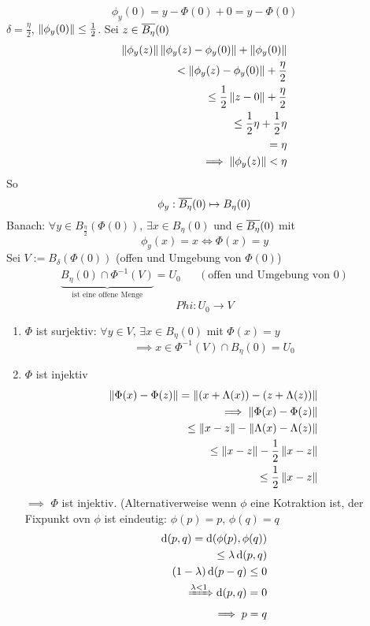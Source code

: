 \[\phi_y(0)=y-\Phi(0)+0=y-\Phi(0)\]
$\delta=\frac{\eta}{2}$, $\left\| \phi_y(0) \right\|\leq\frac{1}{2}$. Sei $z\in\overline{B_\eta}(0)$
\begin{eqnarray*}
  \left\| \phi_y(z) \right\|\left\| \phi_y(z)-\phi_y(0) \right\|+\left\| \phi_y(0) \right\|\\
  <\left\| \phi_y(z)-\phi_y(0) \right\|+\frac{\eta}{2}\\
  \leq\frac{1}{2}\left\| z-0 \right\|+\frac{\eta}{2}\\
  \leq \frac{1}{2}\eta+\frac{1}{2}\eta\\
  =\eta\\
  \implies\left\| \phi_y(z) \right\|<\eta
\end{eqnarray*}
So 
\[\phi_y:\overline{B_\eta}(0)\mapsto B_\eta(0)\]
Banach: $\forall y\in B_{\frac{\eta}{2}}(\Phi(0))$, $\exists x \in B_\eta(0)$ und $\in \overline{B_\eta}(0)$ mit
\[\phi_y(x)=x\iff\Phi(x)=y\]
Sei $V:=B_\delta(\Phi(0))$ (offen und Umgebung von $\Phi(0)$)
\begin{align*}
  \underbrace{B_\eta(0)\cap\Phi^{-1}(V)}_{\text{ist eine offene Menge}}=U_0 & & (\text{offen und Umgebung von 0})
\end{align*}
\[Phi:U_0\to V\]
\begin{enumerate}
  \item $\Phi$ ist surjektiv: $\forall y\in V$, $\exists x\in B_\eta(0)$ mit $\Phi(x)=y$
    \[\implies x\in \Phi^{-1}(V)\cap B_\eta(0)=U_0\]
  \item $\Phi$ ist injektiv
    \begin{eqnarray*}
      \left\| \Phi(x)-\Phi(z) \right\|=\left\| (x+\Lambda(x))-(z+\Lambda(z)) \right\|\\
      \implies\left\| \Phi(x)-\Phi(z) \right\|\\
      \leq\left\| x-z \right\|-\left\| \Lambda(x)-\Lambda(z) \right\|\\
      \leq\left\| x-z \right\|-\frac{1}{2}\left\| x-z \right\|\\
      \leq\frac{1}{2}\left\| x-z \right\|\\
    \end{eqnarray*}
    $\implies$ $\Phi$ ist injektiv. (Alternativerweise wenn $\phi$ eine Kotraktion ist, der Fixpunkt ovn $\phi$ ist eindeutig: $\phi(p)=p$, $\phi(q)=q$
    \begin{eqnarray*}
      \operatorname{d}(p,q)=\operatorname{d}(\phi(p),\phi(q))\\
      \leq\lambda\operatorname{d}(p,q)\\
      (1-\lambda)\operatorname{d}(p-q)\leq 0\\
      \xRightarrow{\lambda<1}\operatorname{d}(p,q)=0\\
      \implies p=q
    \end{eqnarray*}
\end{enumerate}
